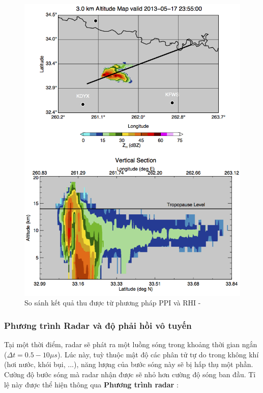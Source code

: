 \begin{figure}[H]
    \centering
    \includegraphics[width=\linewidth]{Images/2.1-ppi-and-rhi.png}
    \caption{So sánh kết quả thu được từ phương pháp PPI và RHI - \cite{stackexchange-ppi-rhi}}
    \label{fig:ppi-and-rhi}
\end{figure}

\subsubsection{Phương trình Radar và độ phải hồi vô tuyến}
Tại một thời điểm, radar sẽ phát ra một luồng sóng trong khoảng thời gian ngắn ($\Delta t = 0.5 - 10 \mu s$). Lúc này, tuỳ thuộc mật độ các phân tử tự do trong không khí (hơi nước, khói bụi, ...), năng lượng của bước sóng này sẽ bị hấp thụ một phần. Cường độ bước sóng mà radar nhận được sẽ nhỏ hơn cường độ sóng ban đầu. Tỉ lệ này được thể hiện thông qua \textbf{Phương trình radar} \cite{2022Weather}:


